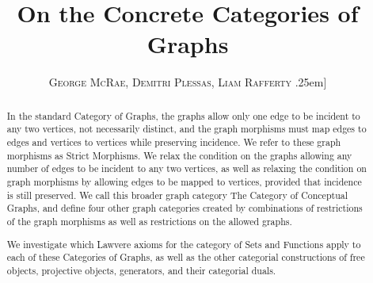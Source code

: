 \documentclass[11pt]{article}
\begin{document}
\pagestyle{headings}


 \title{\sffamily On the Concrete Categories of Graphs}
\author{
    \textsc{George McRae, Demitri Plessas, Liam Rafferty} \0.25em]
    }

\maketitle



\vspace*{-2em}

\begin{abstract}
\noindent
\par{In the standard Category of Graphs, the graphs allow only one edge to be incident to any two vertices, not necessarily distinct, and the graph morphisms must map edges to edges and vertices to vertices while preserving incidence. We refer to these graph morphisms as Strict Morphisms. We relax the condition on the graphs allowing any number of edges to be incident to any two vertices, as well as relaxing the condition on graph morphisms by allowing edges to be mapped to vertices, provided that incidence is still preserved. We call this broader graph category The Category of Conceptual Graphs, and define four other graph categories created by combinations of restrictions of the graph morphisms as well as restrictions on the allowed graphs.}
\par{We investigate which Lawvere axioms for the category of Sets and Functions apply to each of these Categories of Graphs, as well as the other categorial constructions of free objects, projective objects, generators, and their categorial duals.}
\end{abstract}

\tableofcontents
\end{document}
